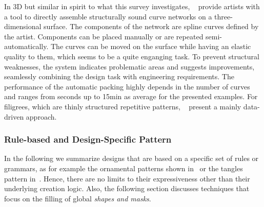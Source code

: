 In 3D but similar in spirit to what this survey investigates, \citeauthor*{zehnder_2016_dso}~\cite{zehnder_2016_dso} provide artists with a tool to directly assemble structurally sound curve networks on a three-dimensional surface. The components of the network are spline curves defined by the artist. Components can be placed manually or are repeated semi-automatically. The curves can be moved on the surface while having an elastic quality to them, which seems to be a quite enganging task. To prevent structural weaknesses, the system indicates problematic areas and suggests improvements, seamlessly combining the design task with engineering requirements. The performance of the automatic packing highly depends in the number of curves and ranges from seconds up to 15min as average for the presented examples. For filigrees, which are thinly structured repetitive patterns, \citeauthor*{chen_2016_sof}~\cite{chen_2016_sof} present a mainly data-driven approach. 




\subsubsection{Rule-based and Design-Specific Pattern}
\label{subsubsec:analysis_rulebased_and_designspecific}

In the following we summarize designs that are based on a specific set of rules or grammars, as for example the ornamental patterns shown in~ or the tangles pattern in~. Hence, there are no limits to their expressiveness other than their underlying creation logic. Also, the following section discusses techniques that focus on the filling of global \textit{shapes and masks}.

